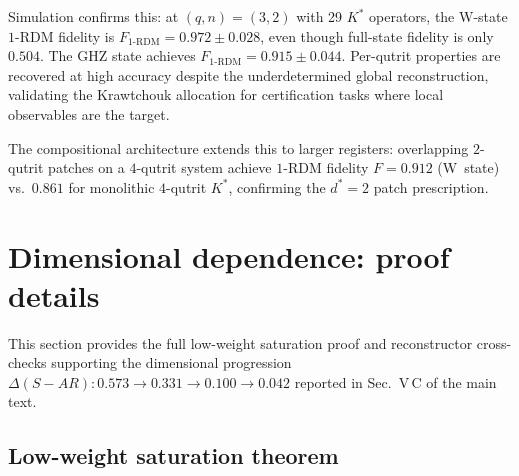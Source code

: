 \documentclass[twocolumn,prx,aps,superscriptaddress,longbibliography]{revtex4-2}
\begin{document}
Simulation confirms this: at $(q,n) = (3,2)$ with 29 $K^*$
operators, the W-state $1$-RDM fidelity is
$F_\mathrm{1\text{-}RDM} = 0.972 \pm 0.028$, even though full-state
fidelity is only $0.504$.  The GHZ state achieves
$F_\mathrm{1\text{-}RDM} = 0.915 \pm 0.044$.  Per-qutrit properties
are recovered at high accuracy despite the underdetermined global
reconstruction, validating the Krawtchouk allocation for
certification tasks where local observables are the target.

The compositional architecture extends this to larger registers:
overlapping $2$-qutrit patches on a $4$-qutrit system achieve
$1$-RDM fidelity $F = 0.912$ (W~state) vs.\ $0.861$ for
monolithic $4$-qutrit $K^*$, confirming the $d^* = 2$ patch
prescription.


\section{Dimensional dependence: proof details}
\label{sec:dim-proof}

This section provides the full low-weight saturation proof and
reconstructor cross-checks supporting the dimensional progression
$\Delta(S{-}AR): 0.573 \to 0.331 \to 0.100 \to 0.042$ reported in
Sec.~V\,C of the main text.

\subsection{Low-weight saturation theorem}
\end{document}
